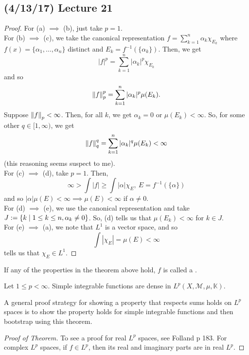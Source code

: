 \documentclass[11pt,leqno,oneside]{amsbook}
\numberwithin{thm}{section}
\newcommand{\M}{\mathcal{M}} %
\newcommand{\K}{\mathbb{K}} %
\begin{document}
\subsection*{(4/13/17) Lecture 21}
\begin{proof}
  For (a) \(\implies\) (b), just take \(p=1\).\\

  For (b) \(\implies\) (c), we take the canonical representation \(f =
  \sum_{k=1}^n \alpha_k \chi_{E_k}\) where \(f(x) = \{\alpha_1,
  \ldots, \alpha_n\}\) distinct and \(E_k =
  f^{-1}(\{\alpha_k\})\). Then, we get \[
    |f|^p = \sum_{k=1}^n |\alpha_k|^p \chi_{E_k}
  \]
  and so \[
    \norm[f]_p^p = \sum_{k=1}^n |\alpha_k|^p \mu(E_k).
  \]
  Suppose \(\norm[f]_p < \infty\). Then, for all \(k\), we get
  \(\alpha_k = 0\) or \(\mu(E_k) < \infty\). So, for some other \(q
  \in [1,\infty)\), we get \[
    \norm[f]_q^q = \sum_{k=1}^n |\alpha_k|^q \mu(E_k) < \infty
  \]
  (this reasoning seems suspect to me). \\

  For (c) \(\implies\) (d), take \(p=1\). Then, \[
    \infty > \int |f| \geq \int |\alpha| \chi_E, \ E = f^{-1}(\{\alpha\})
  \]
  and so \(|\alpha|\mu(E) < \infty \implies \mu(E) < \infty\) if
  \(\alpha \neq 0\). \\

  For (d) \(\implies\) (e), we use the canonical representation and
  take \(J := \{k \st 1 \leq k \leq n, \alpha_k \neq 0\}\). So, (d)
  tells us that \(\mu(E_k) < \infty\) for \(k \in J\).\\

  For (e) \(\implies\) (a), we note that \(L^1\) is a vector space,
  and so \[
    \int |\chi_E| = \mu(E) < \infty
  \]
  tells us that \(\chi_E \in L^1\).
\end{proof}
\begin{defn}
  If any of the properties in the theorem above hold, \(f\) is called
  a .
\end{defn}
\begin{thm}
  Let \(1 \leq p < \infty\). Simple integrable functions are dense in \(L^p(X,\M,\mu,\K)\).
\end{thm}
\begin{rmk}
  A general proof strategy for showing a property that respects sums
  holds on \(L^p\) spaces is to show the property holds for simple
  integrable functions and then bootstrap using this theorem.
\end{rmk}
\begin{proof}[Proof of Theorem]
  To see a proof for real \(L^p\) spaces, see Folland p 183. For
  complex \(L^p\) spaces, if \(f \in L^p\), then its real and
  imaginary parts are in real \(L^p\).
\end{proof}
\end{document}

